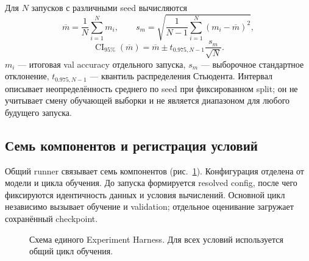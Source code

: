 Для $N$ запусков с различными seed вычисляются
\begin{equation}
\overline m=\frac{1}{N}\sum_{i=1}^{N}m_i,\qquad
s_m=\sqrt{\frac{1}{N-1}\sum_{i=1}^{N}(m_i-\overline m)^2},
\label{eq:statistics}
\end{equation}
\begin{equation}
\operatorname{CI}_{95\%}(\overline m)=
\overline m\pm t_{0.975,N-1}\frac{s_m}{\sqrt N}.
\label{eq:ci}
\end{equation}
$m_i$ --- итоговая val accuracy отдельного запуска, $s_m$ --- выборочное стандартное отклонение, $t_{0.975,N-1}$ --- квантиль распределения Стьюдента. Интервал описывает неопределённость среднего по seed при фиксированном split; он не учитывает смену обучающей выборки и не является диапазоном для любого будущего запуска.

\subsection{Семь компонентов и регистрация условий}
Общий runner связывает семь компонентов (рис.~\ref{fig:harness}). Конфигурация отделена от модели и цикла обучения. До запуска формируется resolved config, после чего фиксируются идентичность данных и условия вычислений. Основной цикл независимо вызывает обучение и validation; отдельное оценивание загружает сохранённый checkpoint.

\begin{figure}[H]
\centering
{}
\caption{Схема единого Experiment Harness. Для всех условий используется общий цикл обучения.}\label{fig:harness}
\end{figure}


